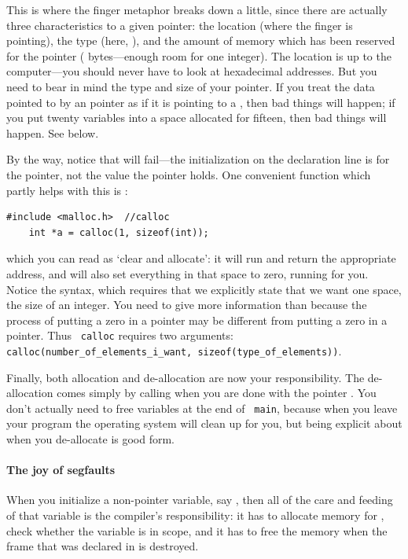 \documentclass[12pt]{article}
\makeatletter
\def\ttind#1{\index{#1@\cinline{#1}}\cinline{#1}}
\def\ttindex#1{\index{#1@\cinline{#1}}}
\makeatother
\begin{document}
This is where the finger metaphor breaks down a little, since there are actually three characteristics
to a given pointer: the location (where the finger is pointing), the type (here, ), and the
amount of memory which has been reserved for the pointer ( bytes---enough room for one
integer). The location is up to the computer---you should never have
to look at hexadecimal addresses. But you need to bear in mind the type
and size of your pointer. If you treat the data pointed to by an  pointer as if it is pointing to a , then bad things will
happen; if you put twenty variables into a space allocated for fifteen,
then bad things will happen. See below.

By the way, notice that  will fail---the initialization on the declaration line is for
the pointer, not the value the pointer holds. One convenient function which partly helps with this is
\ttind{calloc}:
\begin{lstlisting}
#include <malloc.h>  //calloc
    int *a = calloc(1, sizeof(int));
\end{lstlisting}
which you can read as `clear and allocate': it will run 
and return the appropriate address, and will also set everything in
that space to zero, running  for you. Notice the syntax,
which requires that we explicitly state that we want one space, the
size of an integer. You need to give more information than 
because the process of putting a zero in a  pointer may be
different from putting a zero in a  pointer. Thus {\tt
calloc} requires two arguments: {\tt
calloc(number\_of\_elements\_i\_want, sizeof(type\_of\_elements))}.

Finally, both allocation and de-allocation are now your
responsibility. The de-allocation comes simply by calling  \ttindex{free}
when you are done with the pointer . You don't actually need to free variables at the end of {\tt
main}, because when you leave your program the operating system will clean up for you, but being explicit
about when you de-allocate is good form.

\paragraph{The joy of segfaults}  
When you initialize a non-pointer variable, say , then all of
the care and feeding of that variable is the compiler's responsibility:
it has to allocate memory for , check whether the variable is
in scope, and it has to free the memory when the frame that 
was declared in is destroyed.
\end{document}
